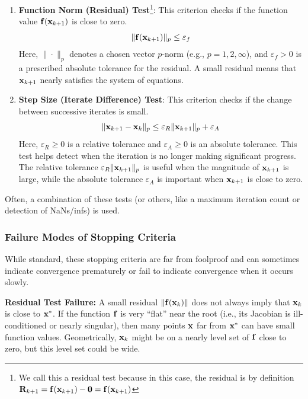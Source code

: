 \begin{enumerate}
    \item \textbf{Function Norm (Residual) Test}\footnote{We call this a residual test because in this case, the residual is by definition $\mathbf{R}_{k+1} = \mathbf{f}(\mathbf{x}_{k+1}) - \mathbf{0} = \mathbf{f}(\mathbf{x}_{k+1})$}: This criterion checks if the function value $\mathbf{f}(\mathbf{x}_{k+1})$ is close to zero.
    \[
        \|\mathbf{f}(\mathbf{x}_{k+1})\|_p \le \varepsilon_f
    \]
    Here, $\|\cdot\|_p$ denotes a chosen vector $p$-norm (e.g., $p=1, 2, \infty$), and $\varepsilon_f > 0$ is a prescribed absolute tolerance for the residual. A small residual means that $\mathbf{x}_{k+1}$ nearly satisfies the system of equations.

    \item \textbf{Step Size (Iterate Difference) Test}: This criterion checks if the change between successive iterates is small.
    \[
        \|\mathbf{x}_{k+1} - \mathbf{x}_k\|_p \le \varepsilon_R \|\mathbf{x}_{k+1}\|_p + \varepsilon_A
    \]
    Here, $\varepsilon_R \ge 0$ is a relative tolerance and $\varepsilon_A \ge 0$ is an absolute tolerance. This test helps detect when the iteration is no longer making significant progress. The relative tolerance $\varepsilon_R \|\mathbf{x}_{k+1}\|_p$ is useful when the magnitude of $\mathbf{x}_{k+1}$ is large, while the absolute tolerance $\varepsilon_A$ is important when $\mathbf{x}_{k+1}$ is close to zero.
\end{enumerate}
Often, a combination of these tests (or others, like a maximum iteration count or detection of NaNs/infs) is used.

\subsubsection{Failure Modes of Stopping Criteria}
While standard, these stopping criteria are far from foolproof and can sometimes indicate convergence prematurely or fail to indicate convergence when it occurs slowly.

\textbf{Residual Test Failure:}
A small residual $\|\mathbf{f}(\mathbf{x}_k)\|$ does not always imply that $\mathbf{x}_k$ is close to $\mathbf{x}^*$. If the function $\mathbf{f}$ is very ``flat'' near the root (i.e., its Jacobian is ill-conditioned or nearly singular), then many points $\mathbf{x}$ far from $\mathbf{x}^*$ can have small function values. Geometrically, $\mathbf{x}_k$ might be on a nearly level set of $\mathbf{f}$ close to zero, but this level set could be wide.

